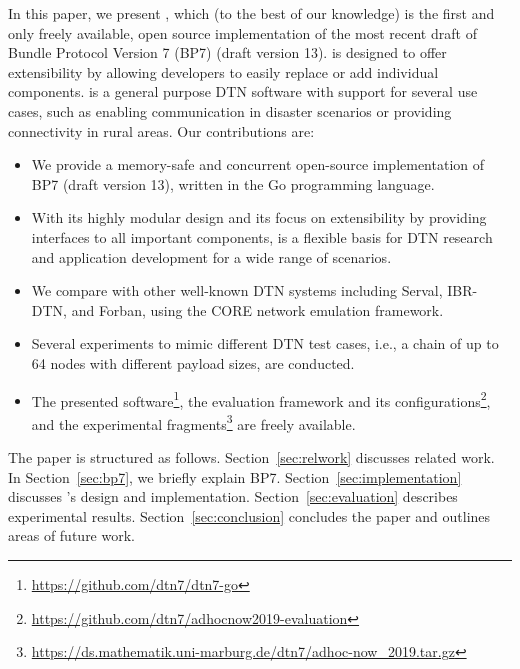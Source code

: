 In this paper, we present \dtn, which (to the best of our knowledge) is the first and only freely available, open source implementation of the most recent draft of Bundle Protocol Version 7 (BP7) (draft version 13).
\dtn is designed to offer extensibility by allowing developers to easily replace or add individual components. 
\dtn is a general purpose DTN software with support for several use cases, such as enabling communication in disaster scenarios or providing connectivity in rural areas. 
Our contributions are:
\begin{itemize}
    \item We provide a memory-safe and concurrent open-source implementation of BP7 (draft version 13), written in the Go programming language.
    \item With its highly modular design and its focus on extensibility by providing interfaces to all important components, \dtn is a flexible basis for DTN research and application development for a wide range of scenarios.
    \item We compare \dtn with other well-known DTN systems including Serval, IBR-DTN, and Forban, using the CORE network emulation framework.
    \item Several experiments to mimic different DTN test cases, i.e., a chain of up to 64 nodes with different payload sizes,
    are conducted.
    \item The presented \dtn 
    software\footnote{\url{https://github.com/dtn7/dtn7-go}},
    the evaluation framework and its 
    configurations\footnote{\url{https://github.com/dtn7/adhocnow2019-evaluation}},
    and the experimental 
    fragments\footnote{\url{https://ds.mathematik.uni-marburg.de/dtn7/adhoc-now_2019.tar.gz}}
    are freely available.
\end{itemize}

The paper is structured as follows. Section~\ref{sec:relwork} discusses related work. 
In Section~\ref{sec:bp7}, we briefly explain BP7. Section~\ref{sec:implementation} discusses \dtn's design and implementation.
Section~\ref{sec:evaluation} describes experimental results. Section~\ref{sec:conclusion} concludes the paper and outlines areas of future work.

